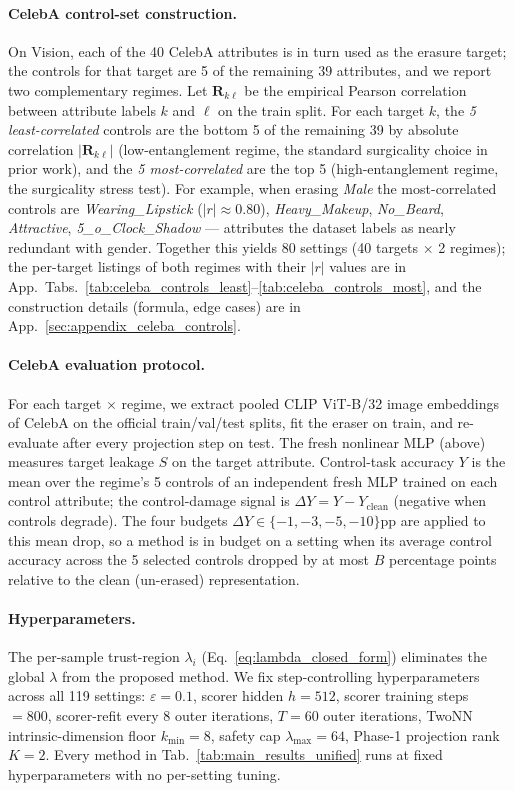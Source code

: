 \paragraph{CelebA control-set construction.} On Vision, each of the 40 CelebA attributes is in turn used as the erasure target; the controls for that target are 5 of the remaining 39 attributes, and we report two complementary regimes. Let $\mathbf{R}_{k\ell}$ be the empirical Pearson correlation between attribute labels $k$ and $\ell$ on the train split. For each target $k$, the \emph{5 least-correlated} controls are the bottom 5 of the remaining 39 by absolute correlation $|\mathbf{R}_{k\ell}|$ (low-entanglement regime, the standard surgicality choice in prior work), and the \emph{5 most-correlated} are the top 5 (high-entanglement regime, the surgicality stress test). For example, when erasing \emph{Male} the most-correlated controls are \emph{Wearing\_Lipstick} ($|r| \approx 0.80$), \emph{Heavy\_Makeup}, \emph{No\_Beard}, \emph{Attractive}, \emph{5\_o\_Clock\_Shadow} --- attributes the dataset labels as nearly redundant with gender. Together this yields 80 settings (40 targets $\times$ 2 regimes); the per-target listings of both regimes with their $|r|$ values are in App.~Tabs.~\ref{tab:celeba_controls_least}--\ref{tab:celeba_controls_most}, and the construction details (formula, edge cases) are in App.~\ref{sec:appendix_celeba_controls}.

\paragraph{CelebA evaluation protocol.} For each target $\times$ regime, we extract pooled CLIP ViT-B/32 image embeddings of CelebA on the official train/val/test splits, fit the eraser on train, and re-evaluate after every projection step on test. The fresh nonlinear MLP (above) measures target leakage $S$ on the target attribute. Control-task accuracy $Y$ is the mean over the regime's 5 controls of an independent fresh MLP trained on each control attribute; the control-damage signal is $\Delta Y = Y - Y_{\text{clean}}$ (negative when controls degrade). The four budgets $\Delta Y \in \{-1, -3, -5, -10\}$pp are applied to this mean drop, so a method is in budget on a setting when its average control accuracy across the 5 selected controls dropped by at most $B$ percentage points relative to the clean (un-erased) representation.

\paragraph{Hyperparameters.} The per-sample trust-region $\lambda_i$ (Eq.~\ref{eq:lambda_closed_form}) eliminates the global $\lambda$ from the proposed method. We fix step-controlling hyperparameters across all 119 settings: $\varepsilon = 0.1$, scorer hidden $h = 512$, scorer training steps $= 800$, scorer-refit every 8 outer iterations, $T = 60$ outer iterations, TwoNN intrinsic-dimension floor $k_{\min} = 8$, safety cap $\lambda_{\max} = 64$, Phase-1 projection rank $K = 2$. Every method in Tab.~\ref{tab:main_results_unified} runs at fixed hyperparameters with no per-setting tuning.
